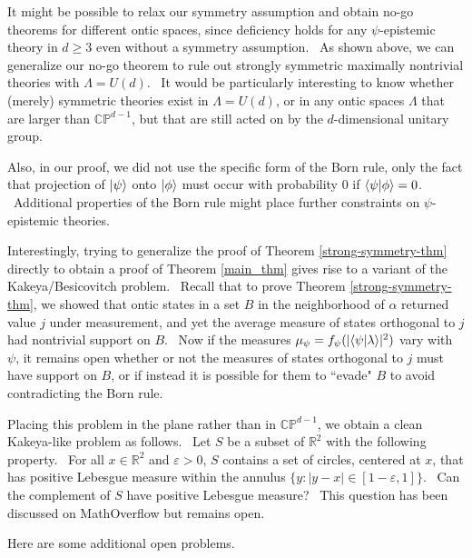 \documentclass[letterpaper,12pt]{article}
\newcommand{\braket}[2]{\mbox{$ \langle #1 | #2 \rangle $}}
\newcommand{\ket}[1]{\mbox{$ | #1 \rangle $}}
\begin{document}
It might be possible to relax our symmetry assumption and obtain no-go theorems for different ontic spaces,
since deficiency holds for any $\psi$-epistemic theory in $d\geq 3$ even
without a symmetry assumption. \ As shown above, we can generalize our no-go theorem to rule out strongly symmetric maximally nontrivial theories with $\Lambda=U(d)$. \ It would be particularly interesting to know whether (merely) symmetric theories exist in $\Lambda=U(d)$, or in any ontic spaces $\Lambda$ that are larger than $\mathbb{CP}^{d-1}$, but that are still acted on by the $d$-dimensional unitary group.

Also, in our proof, we did not use the
specific form of the Born rule, only the fact that projection of $\ket{\psi}$ onto $\ket{\phi}$ must occur with
probability $0$ if $\braket{\psi}{\phi}=0$. \ Additional properties of the Born rule might place further constraints on
$\psi$-epistemic theories.

Interestingly, trying to generalize the proof of Theorem \ref{strong-symmetry-thm} directly to obtain a proof of Theorem \ref{main_thm} gives rise to a  variant of the Kakeya/Besicovitch problem. \ Recall that to prove Theorem \ref{strong-symmetry-thm}, we showed that ontic states in a set $B$ in the neighborhood of $\alpha$ returned value $j$ under measurement, and yet the average measure of states orthogonal to $j$ had nontrivial support on $B$. \ Now if the measures $\mu_\psi = f_\psi (|\braket{\psi}{\lambda}|^2)$ vary with $\psi$, it remains open whether or not the measures of states orthogonal to $j$ must have support on $B$, or if instead it is possible for them to ``evade" $B$ to avoid contradicting the Born rule.

Placing this problem in the plane rather than in $\mathbb{CP}^{d-1}$, we obtain a clean Kakeya-like problem as follows. \ Let $S$ be a subset of $\mathbb{R}^2$ with the following property. \ For all $x \in \mathbb{R}^2$ and $\varepsilon > 0$,  $S$ contains a set of circles, centered at $x$, that has positive Lebesgue measure within the annulus $ \{ y : | y-x | \in [1-\varepsilon,1] \}$. \ Can the complement of $S$ have positive Lebesgue measure? \ This question has been discussed on MathOverflow \cite{mathoverflow2} but remains open.

Here are some additional open problems.
\end{document}
